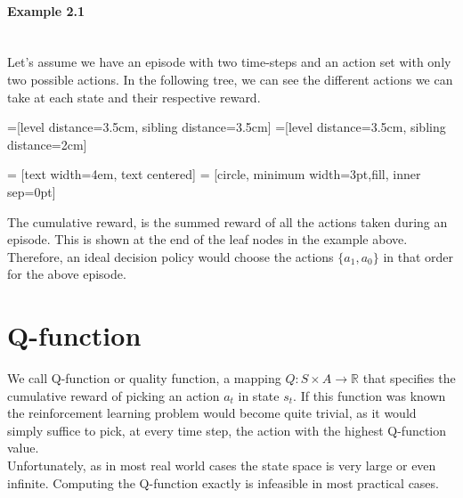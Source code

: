 \paragraph{Example 2.1}\mbox{}\\
Let's assume we have an episode with two time-steps and an action set with only two possible actions. In the following tree, we can see the different actions we can take at each state and their respective reward.

=[level distance=3.5cm, sibling distance=3.5cm]
=[level distance=3.5cm, sibling distance=2cm]

 = [text width=4em, text centered]
 = [circle, minimum width=3pt,fill, inner sep=0pt]

\begin{center}
	
\end{center}
The cumulative reward, is the summed reward of all the actions taken during an episode. This is shown at the end of the leaf nodes in the example above. Therefore, an ideal decision policy would choose the actions $\{a_1,a_0\}$ in that order for the above episode.
 \section{Q-function}
 We call Q-function or quality function, a mapping $Q:S \times A \rightarrow \mathbb{R}$ that specifies the cumulative reward of picking an action $a_t$ in state $s_t$. If this function was known the reinforcement learning problem would become quite trivial, as it would simply suffice to pick, at every time step, the action with the highest Q-function value.\\
 Unfortunately, as in most real world cases the state space is very large or even infinite. Computing the Q-function exactly is infeasible in most practical cases.
